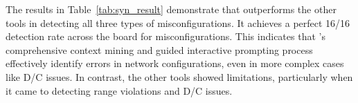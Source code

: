 \begin{table}[thb]
\centering
{}
\caption{Configuration Update Verification Results.}
\label{tab:syn_result}
\end{table}

The results in Table~\ref{tab:syn_result} demonstrate that \sysname{} outperforms the other tools in detecting all three types of misconfigurations. It achieves a perfect 16/16 detection rate across the board for misconfigurations. This indicates that \sysname{}'s comprehensive context mining and guided interactive prompting process effectively identify errors in network configurations, even in more complex cases like D/C issues. In contrast, the other tools showed limitations, particularly when it came to detecting range violations and D/C issues.

